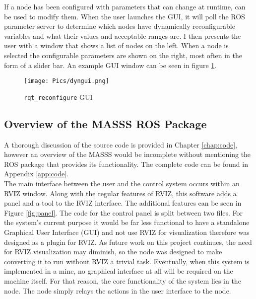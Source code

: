 If a node has been configured with parameters that can change at runtime,  can be used to modify them. When the user launches the GUI, it will poll the ROS parameter server to determine which nodes have dynamically reconfigurable variables and what their values and acceptable ranges are. I then presents the user with a window that shows a list of nodes on the left. When a node is selected the configurable parameters are shown on the right, most often in the form of a slider bar. An example  GUI window can be seen in figure \ref{fig:dyngui2}.

\begin{figure}[h]
    \centering
    \texttt{[image: Pics/dyngui.png]}
    \caption{\texttt{rqt\_reconfigure} GUI}
    \label{fig:dyngui2}
\end{figure}

\subsection{Overview of the MASSS ROS Package}
\label{sub:software}

A thorough discussion of the source code is provided in Chapter \ref{chap:code}, however an overview of the MASSS would be incomplete without mentioning the ROS package that provides its functionality. The complete code can be found in Appendix \ref{app:code}.\\ 

The main interface between the user and the control system occurs within an RVIZ window. Along with the regular features of RVIZ, this software adds a panel and a tool to the RVIZ interface. The additional features can be seen in Figure \ref{fig:panel}. The code for the control panel is split between two files. For the system's current purpose it would be far less functional to have a standalone Graphical User Interface (GUI) and not use RVIZ for visualization therefore  was designed as a plugin for RVIZ. As future work on this project continues, the need for RVIZ visualization may diminish, so the node was designed to make converting it to run without RVIZ a trivial task. Eventually, when this system is implemented in a mine, no graphical interface at all will be required on the machine itself. For that reason, the core functionality of the system lies in the  node. The  node simply relays the actions in the user interface to the  node.\\

